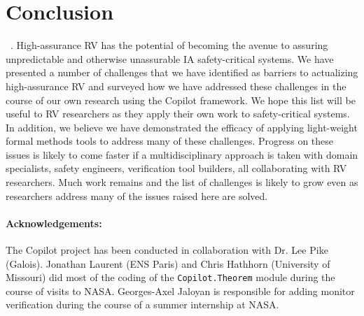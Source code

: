 \section{Conclusion}~\label{sec:conclusion}.  High-assurance RV has
the potential of becoming the avenue to assuring unpredictable and
otherwise unassurable IA safety-critical systems. We have presented a
number of challenges that we have identified as barriers to
actualizing high-assurance RV and surveyed how we have addressed these
challenges in the course of our own research using the Copilot
framework. We hope this list will be useful to RV researchers as they
apply their own work to safety-critical systems.  In addition, we
believe we have demonstrated the efficacy of applying light-weight
formal methods tools to address many of these challenges.  Progress on
these issues is likely to come faster if a multidisciplinary approach
is taken with domain specialists, safety engineers, verification tool
builders, all collaborating with RV researchers. Much work
remains and the list of challenges is likely to grow even as
researchers address many of the issues raised here are solved. 

\paragraph{Acknowledgements:} The Copilot project  has
been conducted in collaboration with Dr. Lee Pike (Galois).  Jonathan
Laurent (ENS Paris)  and Chris Hathhorn (University of Missouri) did
most of the coding of the {\tt Copilot.Theorem} module during the
course of visits to NASA.   Georges-Axel Jaloyan is responsible for
adding monitor verification during the course of a summer internship
at NASA.  